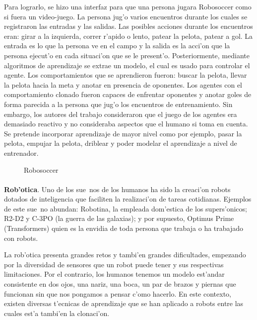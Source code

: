 \documentclass[11pt]{article}
\begin{document}
Para lograrlo, se hizo una interfaz para que una persona jugara Robosoccer como si fuera un video-juego. La persona jug'o varios encuentros durante los cuales se registraron las entradas y las salidas. Las posibles acciones durante los encuentros eran: girar a la izquierda, correr r'apido o lento, patear la pelota, patear a gol. La entrada es lo que la persona ve en el campo y la salida es la acci'on que la persona ejecut'o en cada situaci'on que se le present'o. Posteriormente, mediante algoritmos de aprendizaje se extrae un modelo, el cual es usado para controlar el agente. Los comportamientos que se aprendieron fueron: buscar la pelota, llevar la pelota hacia la meta y anotar en presencia de oponentes. Los agentes con el comportamiento clonado fueron capaces de enfrentar oponentes y anotar goles de forma parecida a la persona que jug'o los encuentros de entrenamiento. Sin embargo, los autores del trabajo consideraron que el juego de los agentes era demasiado reactivo y no consideraba aspectos que el humano si toma en cuenta. Se pretende incorporar aprendizaje de mayor nivel como por ejemplo, pasar la pelota, empujar la pelota, driblear y poder modelar el aprendizaje a nivel de entrenador.

\begin{figure}[h]

\centering
{}
\caption[Robosoccer]{Robosoccer} 
\label{fig:robosoc}

\end{figure}


\paragraph{}
\noindent
\textbf{Rob'otica}. Uno de los sue~nos de los humanos ha sido la creaci'on robots dotados de inteligencia que faciliten la realizaci'on de tareas cotidianas. Ejemplos de este sue~no abundan: Robotina, la empleada dom'estica de los supers'onicos; R2-D2 y C-3PO (la guerra de las galaxias); y por supuesto, Optimus Prime (Transformers) quien es la envidia de toda persona que trabaja o ha trabajado con robots. 

La rob'otica presenta grandes retos y tambi'en grandes dificultades, empezando por la diversidad de sensores que un robot puede tener y sus respectivas limitaciones. Por el contrario, los humanos tenemos un modelo est'andar consistente en dos ojos, una nariz, una boca, un par de brazos y piernas que funcionan sin que nos pongamos a pensar c'omo hacerlo. En este contexto, existen diversas t'ecnicas de aprendizaje que se han aplicado a robots entre las cuales est'a tambi'en la clonaci'on.
\end{document}
